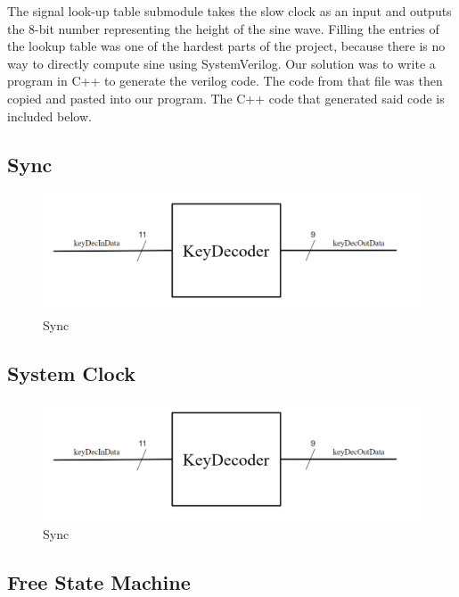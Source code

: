 \documentclass[a4paper]{article}
\begin{document}
The signal look-up table submodule takes the slow clock as an input and outputs the 8-bit number representing the height of the sine wave. Filling the entries of the lookup table was one of the hardest parts of the project, because there is no way to directly compute sine using SystemVerilog.
\newline\newline
Our solution was to write a program in C++ to generate the verilog code. The code from that file was then copied and pasted into our program. The C++ code that generated said code is included below.


\subsection{Sync}

\begin{figure}[h]
    \includegraphics[width=6 in]{./Images/DiagramsYang/keyDec.png}
    \caption{Sync}
    \label{fig:15}
\end{figure}




\subsection{System Clock}

\begin{figure}[h]
    \includegraphics[width=6 in]{./Images/DiagramsYang/keyDec.png}
    \caption{Sync}
    \label{fig:16}
\end{figure}




\subsection{Free State Machine}
\end{document}
